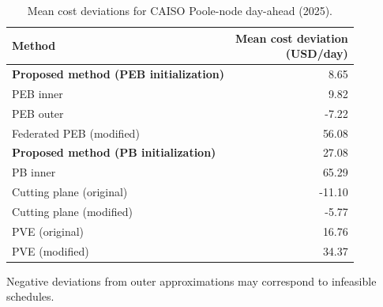 \begin{table}[t]
\centering
\caption{Mean cost deviations for CAISO Poole-node day-ahead (2025).}
\label{tab:mean_cost_deviation}
\small
\setlength{\tabcolsep}{4pt}
\begin{tabular}{lr}
\toprule
Method & \shortstack{Mean cost deviation\\(USD/day)} \\
\midrule
\textbf{Proposed method (PEB initialization)} & 8.65 \\
PEB inner & 9.82 \\
PEB outer & -7.22 \\
Federated PEB (modified) & 56.08 \\
\textbf{Proposed method (PB initialization)} & 27.08 \\
PB inner & 65.29 \\
Cutting plane (original) & -11.10 \\
Cutting plane (modified) & -5.77 \\
PVE (original) & 16.76 \\
PVE (modified) & 34.37 \\
\bottomrule
\end{tabular}
\par\smallskip
\begin{minipage}{\linewidth}
\footnotesize
Negative deviations from outer approximations may correspond to infeasible schedules.
\end{minipage}
\end{table}
